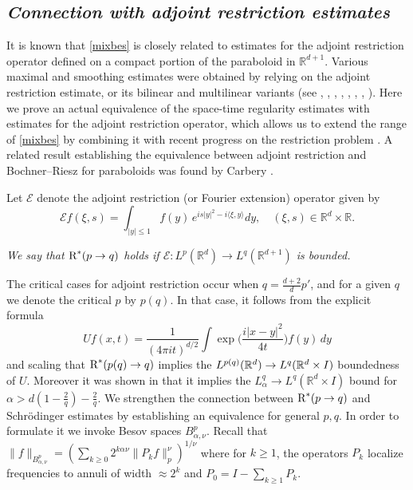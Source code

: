 \documentclass[11pt]{amsart}
\theoremstyle{definition}
\numberwithin{theorem}{section}
\numberwithin{definition}{section}
\numberwithin{equation}{section}
\def\inn#1#2{\langle#1,#2\rangle}
\newcommand{\Be}{\begin{equation}}
\newcommand{\Ee}{\end{equation}}
\renewcommand{\le}{\leqslant}
\renewcommand{\ge}{\geqslant}
\def\inn#1#2{\langle#1,#2\rangle}
\def\noi{\noindent}
\def\bbR{{\mathbb {R}}}
\def\cE{{\mathcal {E}}}
\renewcommand{\le}{\leqslant}
\renewcommand{\ge}{\geqslant}
\begin{document}
\subsection*{\it Connection with adjoint restriction estimates}  It is known that \eqref{mixbes} is closely related to estimates for  the adjoint restriction operator defined on a compact portion of the paraboloid in $\bbR^{d+1}$.   Various maximal and smoothing estimates were obtained by relying on the adjoint restriction estimate, or its bilinear and multilinear variants (see \cite{sj}, \cite{ve}, \cite{boPrinc}, \cite{tava},
\cite{le1}, \cite{ro1}, \cite{B}, \cite {bogu}).  Here we prove  an actual  equivalence of the space-time regularity estimates with  estimates for the adjoint restriction operator, which allows us to extend the range of \eqref{mixbes} by combining it with recent progress on the restriction problem \cite{bogu}. A related result establishing the equivalence between adjoint restriction and Bochner--Riesz for paraboloids was found by Carbery \cite{car}.


Let $\cE$ denote the adjoint restriction (or
Fourier extension) operator given by \Be\label{ext}\cE f(\xi, s )=
\int_{|y|\le 1} f(y)\, e^{i s |y|^2-i\inn{\xi}{y} }dy, \quad
(\xi, s )\in \bbR^{d}\times \bbR. \Ee

\noi {\bf Definition.} {\it We say that
 $\text{\rm R}^*(p\to q)$
holds if $\cE: L^p(\bbR^d)\to L^q(\bbR^{d+1})$ is bounded.}


\medskip

The  critical cases for adjoint restriction occur when
$q=\frac{d+2}{d}p'$, and for a given $q$ we denote the critical $p$
by $p(q)$. In that case, it follows from the explicit formula
\Be\label{expl}Uf(x,t)= \frac{1}{(4\pi it)^{d/2}}\int
\exp\Big(\frac{i|x-y|^2}{4t} \Big)f(y)\, dy\Ee and scaling that
 $\text{\rm R}^*(p(q)\to q)$  implies the
$L^{p(q)}(\Bbb R^d)\to L^{q}(\Bbb R^d\times I) $ boundedness of $U$.
Moreover it was shown in \cite{ro1} that it implies the
$L^{q}_\alpha\to L^{q}(\bbR^d\times I)$ bound for $\alpha>d(1
-\frac{2}{q})-\frac{2}{q}$. We strengthen the connection between
 $\text{\rm R}^*(p\to q)$
and Schr\"odinger estimates  by establishing an   equivalence for
general $p,q$. In order to  formulate it  we invoke
Besov spaces $B^p_{\alpha,\nu}$.
 Recall that
$\|f\|_{B^p_{\alpha,\nu}}=(\sum_{k\ge 0}2^{k\alpha\nu}\| P_kf\|_p^\nu)^{1/\nu}$
where  for $k\ge 1$, the
operators $P_k$  localize frequencies to annuli of width
$\approx 2^k$ and $P_0=I-\sum_{k\ge1} P_k$.
\end{document}
